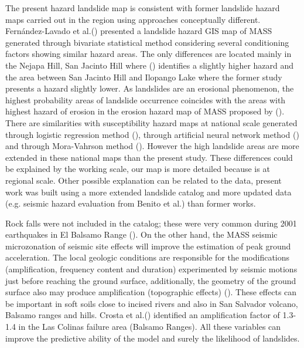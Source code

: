\documentclass[11pt,twoside]{rmta2010esp}%
\begin{document}
The present hazard landslide map is consistent with former landslide hazard maps carried out in the region using approaches conceptually different. Fernández-Lavado et al.(\cite{fernan2008}) presented a landslide hazard GIS map of MASS generated through bivariate statistical method considering several conditioning factors showing similar hazard areas. The only differences are located mainly in the Nejapa Hill, San Jacinto Hill where (\cite{fernan2008}) identifies a slightly higher hazard and the area between San Jacinto Hill and Ilopango Lake where the former study presents a hazard slightly lower. As landslides are an erosional phenomenon, the highest probability areas of landslide occurrence coincides with the areas with highest hazard of erosion in the erosion hazard map of MASS proposed by (\cite{chavez2014a}). There are similarities with susceptibility hazard maps at national scale generated through logistic regression method (\cite{garcia2008}), through artificial neural network method (\cite{garcia2010}) and through Mora-Vahrson method (\cite{snet2004}). However the high landslide areas are more extended in these national maps than the present study. These differences could be explained by the working scale, our map is more detailed because is at regional scale. Other possible explanation can be related to the data, present work was built using a more extended landslide catalog and more updated data (e.g. seismic hazard evaluation from Benito et al.\cite{beni2012}) than former works.

Rock falls were not included in the catalog; these were very common during 2001 earthquakes in El Balsamo Range (\cite{jibson}). On the other hand, the MASS seismic microzonation of seismic site effects will improve the estimation of peak ground acceleration. The local geologic conditions are responsible for the modifications (amplification, frequency content and duration) experimented by seismic motions just before reaching the ground surface, additionally, the geometry of the ground surface also may produce amplification (topographic effects) (\cite{aki1993}). These effects can be important in soft soils close to incised rivers and also in San Salvador volcano, Balsamo ranges and hills. Crosta et al.(\cite{crosta2005}) identified an amplification factor of 1.3-1.4 in the Las Colinas failure area (Balsamo Ranges). All these variables can improve the predictive ability of the model and surely the likelihood of landslides.
\end{document}
